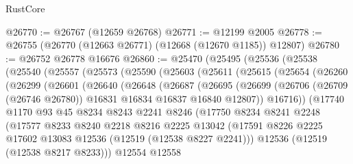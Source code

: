 \begin{lexlean}{RustCore}
\begin{coremodule}
@26770 := @26767 (@12659 @26768)
@26771 := @12199 @2005
@26778 := @26755 (@26770 (@12663 @26771) (@12668 (@12670 @1185)) @12807)
@26780 := @26752 @26778 @16676
@26860 := @25470
    (@25495
      (@25536
        (@25538
          (@25540
            (@25557
              (@25573
                (@25590
                  (@25603
                    (@25611
                      (@25615
                        (@25654
                          (@26260
                            (@26299
                              (@26601
                                (@26640
                                  (@26648
                                    (@26687
                                      (@26695
                                        (@26699
                                          (@26706
                                            (@26709 (@26746 @26780))
                                            @16831
                                            @16834
                                            @16837
                                            @16840
                                            @12807))
                                        @16716))
                                    (@17740
                                      @1170
                                      @93
                                      @45
                                      @8234
                                      @8243
                                      @2241
                                      @8246
                                      (@17750
                                        @8234
                                        @8241
                                        @2248
                                        (@17577
                                          @8233
                                          @8240
                                          @2218
                                          @8216
                                          @2225
                                          @13042
                                          (@17591
                                            @8226
                                            @2225
                                            @17602
                                            @13083
                                            @12536
                                            (@12519 (@12538 @8227 @2241)))
                                          @12536
                                          (@12519 (@12538 @8217 @8233)))
                                        @12554
                                        @12558

\end{coremodule}
\end{lexlean}
